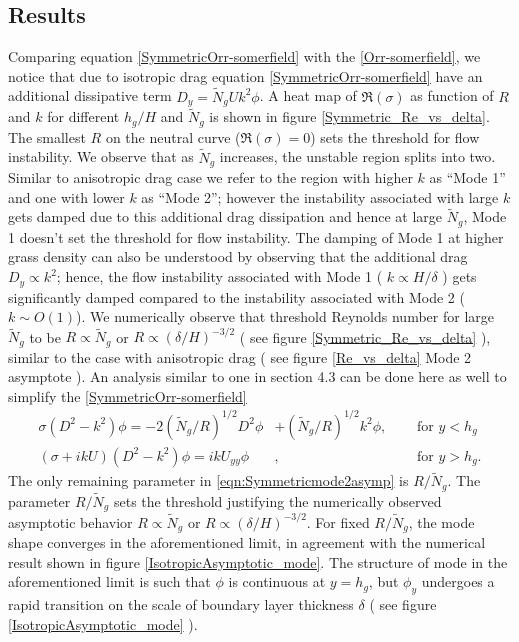 \documentclass[12pt]{report}   %
\newcommand{\hg}{h_g}
\newcommand{\Rey}{{R}}
\newcommand{\Ndg}{\tilde{N}_g}
\begin{document}
\subsection{Results}
Comparing equation \eqref{SymmetricOrr-somerfield} with the \eqref{Orr-somerfield}, we notice that due to isotropic drag equation \eqref{SymmetricOrr-somerfield} have an additional dissipative term $ D_y = \Ndg U k^2 \phi$. %
A heat map of $\Re (\sigma)$ as function of $R$ and $k$ for different $h_g/H$ and $\Ndg$ is shown in figure \ref{Symmetric_Re_vs_delta}. The smallest $R$ on the neutral curve 
($\Re (\sigma)=0$) sets the threshold for flow instability. We observe that as $\Ndg$ increases, the unstable region splits into two. Similar to anisotropic drag case we refer to the region with higher $k$ as ``Mode 1'' and one with lower $k$ as ``Mode 2''; however the instability associated with large $k$ gets damped due to this additional drag dissipation and hence at large $\Ndg$, Mode 1 doesn't set the threshold for flow instability. The damping of Mode 1 at higher grass density can also be understood by observing that the additional drag $D_y \propto k^2$; hence, the flow instability associated with Mode 1 ( $k\propto H/\delta$ ) gets significantly damped compared to the instability associated with Mode 2 ($k\sim O(1)$). We numerically observe that threshold Reynolds number for large $\Ndg$ to be $ R \propto \Ndg$  or $R \propto (\delta/H)^{-3/2}$ ( see figure \ref{Symmetric_Re_vs_delta} ), similar to the case with anisotropic drag ( see figure \ref{Re_vs_delta} Mode 2 asymptote ). An analysis similar 
to one in section 4.3 can be done here as well to simplify the \ref{SymmetricOrr-somerfield}
\begin{subequations}
\begin{align}
\sigma\left( D^2-k^2\right)\phi = -2{(\Ndg/\Rey)^{1/2}}D^2\phi &+ (\Ndg/R)^{1/2} k^2 \phi,  \quad &\text{ for } y<\hg  \label{eqn:Symmetricmode2asympa} \\
\left(\sigma+ikU\right) \left(D^2-k^2\right)\phi =  ikU_{yy}\phi &, \quad &\text{ for } y>\hg. \label{eqn:Symmetricmode2asympb}
\end{align}
\label{eqn:Symmetricmode2asymp}
\end{subequations}
The only remaining parameter in \eqref{eqn:Symmetricmode2asymp} is $\Rey/\Ndg$. The parameter $\Rey/\Ndg$ sets the threshold justifying the numerically observed asymptotic behavior $\Rey \propto \Ndg $ or $ \Rey \propto (\delta/H)^{-3/2}$. For fixed $\Rey/\Ndg$, the mode shape converges in the aforementioned limit, in agreement with the numerical result shown in figure \ref{IsotropicAsymptotic_mode}. The structure of mode in the aforementioned limit is such that $\phi$ is continuous at $y=h_g$, but $\phi_y$ undergoes a rapid transition on the scale of boundary layer thickness $\delta$ 
( see figure \ref{IsotropicAsymptotic_mode} ).
\end{document}
